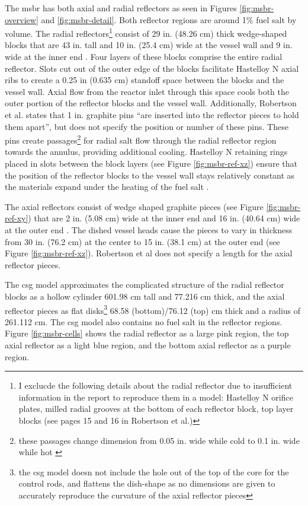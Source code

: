 The \Gls{msbr} has both axial and radial reflectors as seen in Figures
\ref{fig:msbr-overview} and \ref{fig:msbr-detail}. Both reflector regions are around 1\% fuel salt by volume. The radial
reflectors\footnote{I exclucde the following details about the radial reflector
due to insufficient information in the report to reproduce them in a model:
Hastelloy N orifice plates, milled radial grooves at the bottom of each
reflector block, top layer blocks (see pages 15 and 16 in Robertson et al.)}
consist of 29 in. (48.26 cm) thick wedge-shaped blocks that are 43 in. tall and 10 in. (25.4 cm) wide at the vessel wall and 9 in. wide at the inner end \cite{robertson_conceptual_1973}.
Four layers of these blocks comprise the entire radial reflector. Slots cut out
of the outer edge of the blocks facilitate Hastelloy N axial ribs to create a
0.25 in (0.635 cm) standoff space between the blocks and the vessel wall. Axial
flow from the reactor inlet through this space cools both the outer portion of
the reflector blocks and the vessel wall. Additionally, Robertson et al. states
that 1 in. graphite pins ``are inserted into the reflector pieces to hold them
apart'', but does not specify the position or number of these pins. These pins
create passages\footnote{these passages change dimension from 0.05 in. wide
while cold to 0.1 in. wide while hot \cite{robertson_conceptual_1971}} for
radial salt flow through the radial reflector region towards the annulus,
providing additional cooling. Hastelloy N retaining rings placed in slots
between the block layers (see Figure \ref{fig:msbr-ref-xz}) ensure that the
position of the reflector blocks to the vessel wall stays relatively constant as
the materials expand under the heating of the fuel salt
\cite{robertson_conceptual_1973}.

The axial reflectors consist of wedge shaped graphite pieces (see Figure
\ref{fig:msbr-ref-xy}) that are 2 in. (5.08 cm) wide at the inner end and 16 in.
(40.64 cm) wide at the outer end \cite{robertson_conceptual_1971}. The dished
vessel heads cause the pieces to vary in thickness from 30 in. (76.2 cm) at the
center to 15 in. (38.1 cm) at the outer end (see Figure
\ref{fig:msbr-ref-xz})\cite{robertson_conceptual_1971}. Robertson et al does not
specify a length for the axial reflector pieces. 

The \Gls{csg} model approximates the complicated structure of the radial
reflector blocks as a hollow cylinder 601.98 cm tall and 77.216 cm thick, and
the axial reflector pieces as flat disks\footnote{the \Gls{csg} model doesn not
include the hole out of the top of the core for the control rods, and flattens
the dish-shape as no dimensions are given to accurately reproduce the curvature
of the axial reflector pieces} 68.58 (bottom)/76.12 (top) cm thick and a radius
of 261.112 cm. The \Gls{csg} model also contains no fuel salt in the reflector
regions. Figure \ref{fig:msbr-cells} shows the radial reflector as a large pink
region, the top axial reflector as a light blue region, and the bottom axial
reflector as a purple region.


